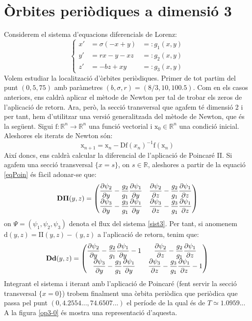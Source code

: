 \documentclass[a4paper]{article}
\newcommand{\RR}{\ensuremath{\mathbb{R}}} %
\newcommand{\vf}[1]{\boldsymbol{\mathrm{#1}}} %
\theoremstyle{definition}
\begin{document}
\section{Òrbites periòdiques a dimensió 3}
Considerem el sistema d'equacions diferencials de Lorenz:
\begin{equation}\label{sist3}
  \left\{
  \begin{aligned}
    x' & = \sigma(-x+y) & =:  g_1(x,y) \\
    y' & = rx-y-xz      & =: g_2(x,y)  \\
    z' & = -bz +xy      & =: g_3(x,y)
  \end{aligned}
  \right.
\end{equation}
Volem estudiar la localització d'òrbites periòdiques. Primer de tot partim del punt $(0, 5, 75)$ amb paràmetres $(b, \sigma, r) = (8/3, 10 , 100.5)$. Com en els casos anteriors, ens caldrà aplicar el mètode de Newton per tal de trobar els zeros de l'aplicació de retorn. Ara, però, la secció transversal que agafem té dimensió 2 i per tant, hem d'utilitzar una versió generalitzada del mètode de Newton, que és la següent. Sigui $\vf{f}:\RR^n\rightarrow\RR^n$ una funció vectorial i $\vf{x}_0\in\RR^n$  una condició inicial. Aleshores els iterats de Newton són:
$$
  \vf{x}_{n+1}=\vf{x}_n - \vf{Df}(x_n)^{-1}\vf{f}(\vf{x}_n)
$$
Així doncs, ens caldrà calcular la diferencial de l'aplicació de Poincaré $\vf{\Pi}$. Si agafem una secció transversal $\{x= s\}$, on $s\in\RR$, aleshores a partir de la equació \eqref{eqPoin} és fàcil adonar-se que:
$$\vf{D\Pi}(y,z)=
  \begin{pmatrix}
    \displaystyle\pdv{\psi_2}{y} - \frac{g_2}{g_1} \pdv{\psi_1}{y} & \displaystyle\pdv{\psi_2}{z} - \frac{g_2}{g_1} \pdv{\psi_1}{z} \\
    \displaystyle\pdv{\psi_3}{y} - \frac{g_3}{g_1} \pdv{\psi_1}{y} & \displaystyle\pdv{\psi_3}{z} - \frac{g_3}{g_1} \pdv{\psi_1}{z}
  \end{pmatrix}
$$
on $\Psi=(\psi_1,\psi_2,\psi_3)$ denota el flux del sistema \eqref{sist3}. Per tant, si anomenem $\vf{d}(y,z)=\vf\Pi(y,z)-(y,z)$ a l'aplicació de retorn, tenim que:
$$\vf{Dd}(y,z)=
  \begin{pmatrix}
    \displaystyle\pdv{\psi_2}{y} - \frac{g_2}{g_1} \pdv{\psi_1}{y} - 1 & \displaystyle\pdv{\psi_2}{z} - \frac{g_2}{g_1} \pdv{\psi_1}{z}    \\
    \displaystyle\pdv{\psi_3}{y} - \frac{g_3}{g_1} \pdv{\psi_1}{y}     & \displaystyle\pdv{\psi_3}{z} - \frac{g_3}{g_1} \pdv{\psi_1}{z} -1
  \end{pmatrix}
$$
Integrant el sistema i iterant amb l'aplicació de Poincaré (fent servir la secció transversal $\{x = 0\}$) trobem finalment una òrbita periòdica que periòdica que passa pel punt $(0,4.2554..., 74.6507...)$ el període de la qual és de $T\simeq 1.0959...$ A la figura \eqref{op3-0} és mostra una representació d'aquesta.
\end{document}
